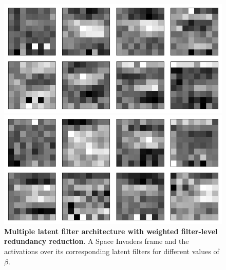 \begin{figure}[h!]
\begin{minipage}{0.55\textwidth}
\caption{$\beta = 1$}
\includegraphics[scale=0.42]{figures/results/weighted_average/beta_4_convolutional_layers_sample_3.png}
\caption{$\beta = 4$}
\includegraphics[scale=0.42]{figures/results/weighted_average/beta_32_convolutional_layers_sample_3.png}
\caption{$\beta = 32$}
\end{minipage}
\caption{\textbf{Multiple latent filter architecture with weighted filter-level redundancy reduction}. A Space Invaders frame and the activations over its corresponding latent filters for different values of $\beta$.}
\label{fig:weighted_average_originals_and_latent_filters}
\end{figure}

